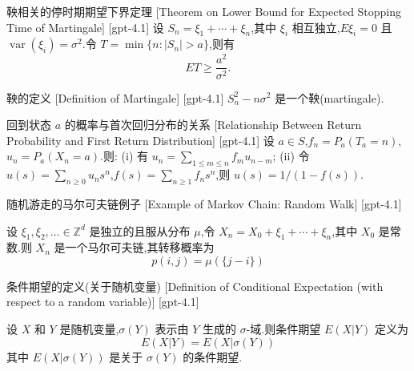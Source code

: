\documentclass[UTF8]{ctexart}
\begin{document}
    
    
    \begin{thm}
        {鞅相关的停时期期望下界定理}
        [Theorem on Lower Bound for Expected Stopping Time of Martingale]
        [gpt-4.1]
        设 $S_n = \xi_1 + \cdots + \xi_n$,其中 $\xi_i$ 相互独立,$E \xi_i = 0$ 且 $\operatorname{var}(\xi_i) = \sigma^2$.令 $T = \min\{n : |S_n| > a\}$,则有
\[
E T \ge \frac{a^2}{\sigma^2}.
\]

    \end{thm}
    
    
    
    \begin{dfn}
        {鞅的定义}
        [Definition of Martingale]
        [gpt-4.1]
        $S_n^2 - n \sigma^2$ 是一个鞅(martingale).
    \end{dfn}
    
    
    
    \begin{ppt}
        {回到状态 $a$ 的概率与首次回归分布的关系}
        [Relationship Between Return Probability and First Return Distribution]
        [gpt-4.1]
        设 $a \in S$,$f_n = P_a(T_a = n)$,$u_n = P_a(X_n = a)$.则:
(i) 有 $u_n = \sum_{1 \leq m \leq n} f_m u_{n-m}$;
(ii) 令 $u(s) = \sum_{n \geq 0} u_n s^n$,$f(s) = \sum_{n \geq 1} f_n s^n$,则 $u(s) = 1 / (1 - f(s))$.

    \end{ppt}
    
    
    
    \begin{xmp}
        {随机游走的马尔可夫链例子}
        [Example of Markov Chain: Random Walk]
        [gpt-4.1]
        
设 $\xi_1, \xi_2, \ldots \in \mathbb{Z}^d$ 是独立的且服从分布 $\mu$,令 $X_n = X_0 + \xi_1 + \cdots + \xi_n$,其中 $X_0$ 是常数.则 $X_n$ 是一个马尔可夫链,其转移概率为
\[
p(i, j) = \mu(\{j-i\})
\]

    \end{xmp}
    
    
    
    \begin{dfn}
        {条件期望的定义(关于随机变量)}
        [Definition of Conditional Expectation (with respect to a random variable)]
        [gpt-4.1]
        
设 $X$ 和 $Y$ 是随机变量,$\sigma(Y)$ 表示由 $Y$ 生成的 $\sigma$-域.则条件期望 $E(X|Y)$ 定义为
\[
E(X|Y) = E(X|\sigma(Y))
\]
其中 $E(X|\sigma(Y))$ 是关于 $\sigma(Y)$ 的条件期望.

    \end{dfn}
    
\end{document}
